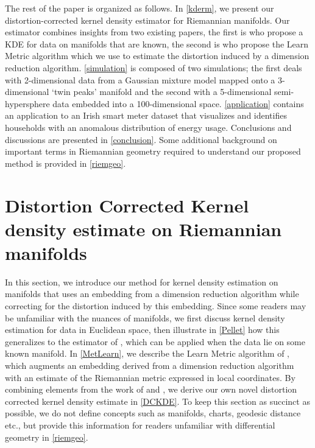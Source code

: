 \documentclass[11pt,a4paper,]{article}
\begin{document}
The rest of the paper is organized as follows. In \autoref{kderm}, we present our distortion-corrected kernel density estimator for Riemannian manifolds. Our estimator combines insights from two existing papers, the first is \textcite{Pelletier2005-vu} who propose a KDE for data on manifolds that are known, the second is \textcite{Perrault-Joncas2013-pq} who propose the Learn Metric algorithm which we use to estimate the distortion induced by a dimension reduction algorithm. \autoref{simulation} is composed of two simulations; the first deals with 2-dimensional data from a Gaussian mixture model mapped onto a 3-dimensional `twin peaks' manifold and the second with a 5-dimensional semi-hypersphere data embedded into a 100-dimensional space. \autoref{application} contains an application to an Irish smart meter dataset that visualizes and identifies households with an anomalous distribution of energy usage. Conclusions and discussions are presented in \autoref{conclusion}. Some additional background on important terms in Riemannian geometry required to understand our proposed method is provided in \autoref{riemgeo}.

\hypertarget{kderm}{%
\section{Distortion Corrected Kernel density estimate on Riemannian manifolds}\label{kderm}}

In this section, we introduce our method for kernel density estimation on manifolds that uses an embedding from a dimension reduction algorithm while correcting for the distortion induced by this embedding. Since some readers may be unfamiliar with the nuances of manifolds, we first discuss kernel density estimation for data in Euclidean space, then illustrate in \autoref{Pellet} how this generalizes to the estimator of \textcite{Pelletier2005-vu}, which can be applied when the data lie on some known manifold. In \autoref{MetLearn}, we describe the Learn Metric algorithm of \textcite{Perrault-Joncas2013-pq}, which augments an embedding derived from a dimension reduction algorithm with an estimate of the Riemannian metric expressed in local coordinates. By combining elements from the work of \textcite{Pelletier2005-vu} and \textcite{Perrault-Joncas2013-pq}, we derive our own novel distortion corrected kernel density estimate in \autoref{DCKDE}. To keep this section as succinct as possible, we do not define concepts such as manifolds, charts, geodesic distance etc., but provide this information for readers unfamiliar with differential geometry in \autoref{riemgeo}.
\end{document}
